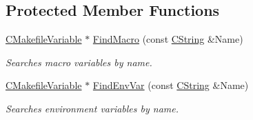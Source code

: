 \subsection*{Protected Member Functions}
\begin{DoxyCompactItemize}
\item 
\hyperlink{classCMakefileVariable}{C\-Makefile\-Variable} $\ast$ \hyperlink{classCMakefileSection_a3b626dd591b6ebbf49382c87f9a4040e}{Find\-Macro} (const \hyperlink{classCString}{C\-String} \&Name)
\begin{DoxyCompactList}\small\item\em Searches macro variables by name. \end{DoxyCompactList}\item 
\hyperlink{classCMakefileVariable}{C\-Makefile\-Variable} $\ast$ \hyperlink{classCMakefileSection_a780f6d59f56d8aee1fbc3687e04eebd5}{Find\-Env\-Var} (const \hyperlink{classCString}{C\-String} \&Name)
\begin{DoxyCompactList}\small\item\em Searches environment variables by name. \end{DoxyCompactList}\end{DoxyCompactItemize}

